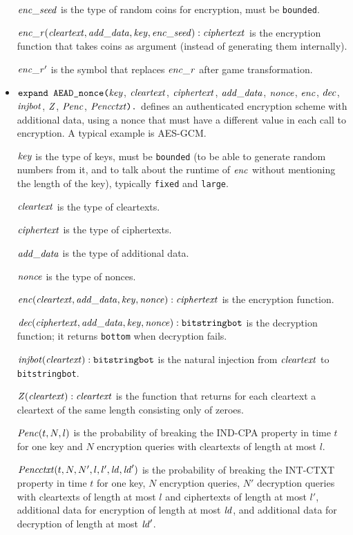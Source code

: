 \documentclass{article}
\begin{document}
\begin{itemize}
  $\mathit{enc\_seed}$ is the type of random coins for encryption, must be \texttt{bounded}.

  $\mathit{enc\_r}(\mathit{cleartext}, \mathit{add\_data}, \mathit{key}, \mathit{enc\_seed}): \mathit{ciphertext}$ is the encryption function that takes coins as argument (instead of generating them internally).

  $\mathit{enc\_r}'$ is the symbol that replaces $\mathit{enc\_r}$ after game transformation.


\item $\texttt{expand AEAD\_nonce(}\mathit{key}$,
$  \mathit{cleartext}$, $\mathit{ciphertext}$, $\mathit{add\_data}$, $\mathit{nonce}$, $\mathit{enc}$,
$  \mathit{dec}$, $\mathit{injbot}$, $\mathit{Z}$, $\mathit{Penc}$, $\mathit{Pencctxt}\texttt{).}$ defines an
authenticated encryption scheme with additional data, using a nonce that must have a different
value in each call to encryption. A typical example is AES-GCM.

   $\mathit{key}$ is the type of keys, must be \texttt{bounded} (to be able to generate random numbers from it, and to talk about the runtime of $\mathit{enc}$ without mentioning the length of the key), typically \texttt{fixed} and \texttt{large}.

   $\mathit{cleartext}$ is the type of cleartexts.

   $\mathit{ciphertext}$ is the type of ciphertexts.

   $\mathit{add\_data}$ is the type of additional data.

   $\mathit{nonce}$ is the type of nonces.

   $\mathit{enc}(\mathit{cleartext}, \mathit{add\_data}, \mathit{key}, \mathit{nonce}): \mathit{ciphertext}$ is the encryption function. 

   $\mathit{dec}(\mathit{ciphertext}, \mathit{add\_data}, \mathit{key}, \mathit{nonce}): \texttt{bitstringbot}$ is the
  decryption function; it returns \texttt{bottom} when decryption
  fails.

   $\mathit{injbot}(\mathit{cleartext}): \texttt{bitstringbot}$ is the natural
  injection from $\mathit{cleartext}$ to \texttt{bitstringbot}.

   $\mathit{Z}(\mathit{cleartext}): \mathit{cleartext}$ is the function that
  returns for each cleartext a cleartext of the same length consisting
  only of zeroes.

  $\mathit{Penc}(t, N, l)$ is the probability of breaking the IND-CPA
  property in time $t$ for one key and $N$ encryption queries with
  cleartexts of length at most $l$.

  $\mathit{Pencctxt}(t, N, N', l, l', \mathit{ld}, \mathit{ld}')$ is the probability of
  breaking the INT-CTXT property in time $t$ for one key, $N$
  encryption queries, $N'$ decryption queries with cleartexts of
  length at most $l$ and ciphertexts of length at most $l'$,
  additional data for encryption of length at most $\mathit{ld}$, and
  additional data for decryption of length at most $\mathit{ld}'$.


\end{itemize}
\end{document}
